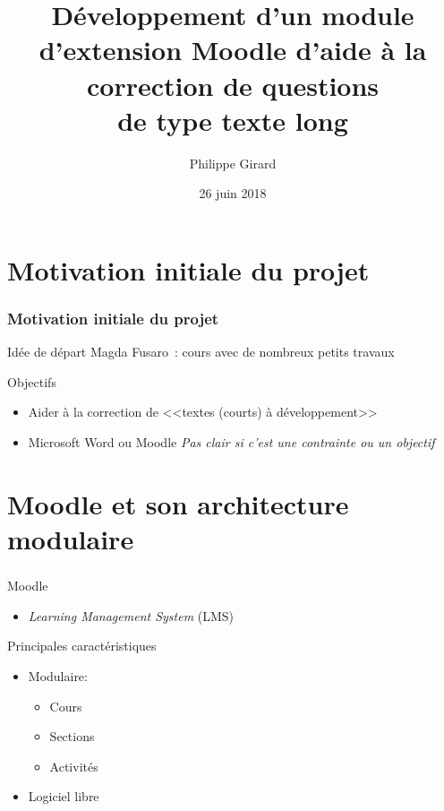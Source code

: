 \documentclass{beamer}
\title[Pr\'esentation du projet de ma\^itrise]{D\'eveloppement d'un module d'extension Moodle d'aide \`a la correction de questions\\de type \og texte long \fg{} }
\author{Philippe Girard}
\institute{Universit\'e du Qu\'ebec \`a Montr\'eal}
\date{26 juin 2018}
\newcommand{\GT}[1]{\alert{\emph{#1}}}
\begin{document}
  \begin{frame}[plain]
  \titlepage
  \end{frame}
  
  \begin{frame}[plain]
  \tableofcontents[hideallsubsections]
  \end{frame}
  
  \section[Introduction]{Motivation initiale du projet}
  \begin{frame}
  \frametitle{Motivation initiale du projet}

\begin{block}{Id\'ee de d\'epart}
Magda Fusaro~: cours avec de nombreux petits travaux 
\end{block}

\vfill

\begin{block}{Objectifs}
  \begin{itemize}
    \item Aider \`a la correction de <<textes (courts) \`a d\'eveloppement>>
    \item Microsoft Word ou Moodle \GT{Pas clair si c'est une
    contrainte ou un objectif}
  \end{itemize}

\end{block}
\vfill

  \end{frame}
  
  \section[Moodle]{Moodle et son architecture modulaire}
  \begin{frame}
  \frametitle{\insertsection}

\begin{block}{Moodle}
  \begin{itemize}
    \item \textit{Learning Management System} (LMS)
  \end{itemize}
\end{block}

\vfill

\begin{block}{Principales caract\'eristiques}
  \begin{itemize}
    \item Modulaire: 
\begin{itemize}
\item Cours 
\item Sections
\item  Activit\'es
\end{itemize}
    \item Logiciel libre
  \end{itemize}
\end{block}
\vfill
  \end{frame}
  
\end{document}
